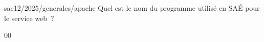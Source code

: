 \begin{question}{sae12/2025/generales/apache}
  Quel est le nom du programme utilisé en SAÉ pour le service web~?
  \begin{reponses}{0}{0}
  \end{reponses}
\end{question}
